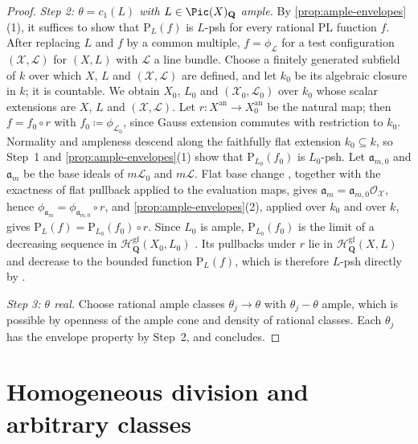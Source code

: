 \documentclass[11pt,a4paper]{article}
\newcommand{\an}{\mathrm{an}}          %
\begin{document}
\begin{proof}
\emph{Step 2: $\theta=c_1(L)$ with $L\in\Pic(X)_{\mathbf Q}$ ample.} By \cref{prop:ample-envelopes}(1), it suffices to show that $\mathrm P_L(f)$ is $L$-psh for every rational PL function $f$. After replacing $L$ and $f$ by a common multiple, $f=\phi_{\mathcal L}$ for a test configuration $(\mathcal X,\mathcal L)$ for $(X,L)$ with $\mathcal L$ a line bundle. Choose a finitely generated subfield of $k$ over which $X$, $L$ and $(\mathcal X,\mathcal L)$ are defined, and let $k_0$ be its algebraic closure in $k$; it is countable. We obtain $X_0$, $L_0$ and $(\mathcal X_0,\mathcal L_0)$ over $k_0$ whose scalar extensions are $X$, $L$ and $(\mathcal X,\mathcal L)$. Let $r\colon X^{\an}\to X_0^{\an}$ be the natural map; then $f=f_0\circ r$ with $f_0\coloneqq\phi_{\mathcal L_0}$, since Gauss extension commutes with restriction to $k_0$. Normality and ampleness descend along the faithfully flat extension $k_0\subseteq k$, so Step~1 and \cref{prop:ample-envelopes}(1) show that $\mathrm P_{L_0}(f_0)$ is $L_0$-psh. Let $\mathfrak a_{m,0}$ and $\mathfrak a_m$ be the base ideals of $m\mathcal L_0$ and $m\mathcal L$. Flat base change \cite[\href{https://stacks.math.columbia.edu/tag/02KH}{Tag 02KH}]{Stacks}, together with the exactness of flat pullback applied to the evaluation maps, gives $\mathfrak a_m=\mathfrak a_{m,0}\mathcal O_{\mathcal X}$, hence $\phi_{\mathfrak a_m}=\phi_{\mathfrak a_{m,0}}\circ r$, and \cref{prop:ample-envelopes}(2), applied over $k_0$ and over $k$, gives $\mathrm P_L(f)=\mathrm P_{L_0}(f_0)\circ r$. Since $L_0$ is ample, $\mathrm P_{L_0}(f_0)$ is the limit of a decreasing sequence in $\mathcal{H}^{\mathrm{gf}}_{\mathbf{Q}}(X_0,L_0)$ \cite[Corollary~12.18(iii) and Example~3.9]{BJ22}. Its pullbacks under $r$ lie in $\mathcal{H}^{\mathrm{gf}}_{\mathbf{Q}}(X,L)$ and decrease to the bounded function $\mathrm P_L(f)$, which is therefore $L$-psh directly by \cite[Definition~4.1]{BJ22}.

\emph{Step 3: $\theta$ real.} Choose rational ample classes $\theta_j\to\theta$ with $\theta_j-\theta$ ample, which is possible by openness of the ample cone and density of rational classes. Each $\theta_j$ has the envelope property by Step~2, and \cite[Lemma~5.9]{BJ22} concludes.
\end{proof}

\section{Homogeneous division and arbitrary classes}
\label{sec:siu-envelopes}
\end{document}

